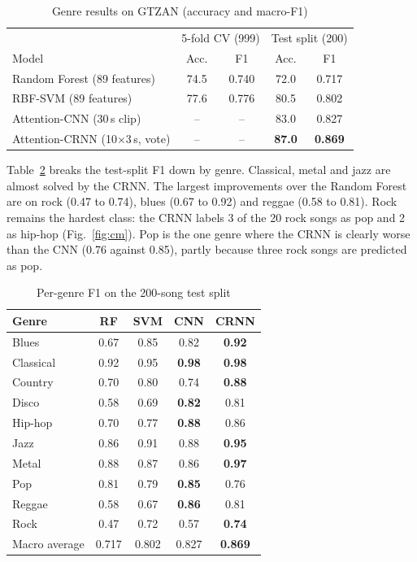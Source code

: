 \documentclass[conference]{IEEEtran}
\begin{document}
\begin{table}[t]
\caption{Genre results on GTZAN (accuracy and macro-F1)}
\label{tab:main}
\centering
\setlength{\tabcolsep}{4pt}
\begin{tabular}{@{}lcccc@{}}
\toprule
 & \multicolumn{2}{c}{5-fold CV (999)} & \multicolumn{2}{c}{Test split (200)}\\
Model & Acc. & F1 & Acc. & F1\\
\midrule
Random Forest (89 features) & 74.5 & 0.740 & 72.0 & 0.717\\
RBF-SVM (89 features) & 77.6 & 0.776 & 80.5 & 0.802\\
Attention-CNN (30\,s clip) & -- & -- & 83.0 & 0.827\\
Attention-CRNN (10$\times$3\,s, vote) & -- & -- & \textbf{87.0} & \textbf{0.869}\\
\bottomrule
\end{tabular}
\end{table}

Table~\ref{tab:pergenre} breaks the test-split F1 down by genre. Classical, metal and jazz are almost solved by the CRNN. The largest improvements over the Random Forest are on rock (0.47 to 0.74), blues (0.67 to 0.92) and reggae (0.58 to 0.81). Rock remains the hardest class: the CRNN labels 3 of the 20 rock songs as pop and 2 as hip-hop (Fig.~\ref{fig:cm}). Pop is the one genre where the CRNN is clearly worse than the CNN (0.76 against 0.85), partly because three rock songs are predicted as pop.

\begin{table}[t]
\caption{Per-genre F1 on the 200-song test split}
\label{tab:pergenre}
\centering
\begin{tabular}{@{}lcccc@{}}
\toprule
Genre & RF & SVM & CNN & CRNN\\
\midrule
Blues & 0.67 & 0.85 & 0.82 & \textbf{0.92}\\
Classical & 0.92 & 0.95 & \textbf{0.98} & \textbf{0.98}\\
Country & 0.70 & 0.80 & 0.74 & \textbf{0.88}\\
Disco & 0.58 & 0.69 & \textbf{0.82} & 0.81\\
Hip-hop & 0.70 & 0.77 & \textbf{0.88} & 0.86\\
Jazz & 0.86 & 0.91 & 0.88 & \textbf{0.95}\\
Metal & 0.88 & 0.87 & 0.86 & \textbf{0.97}\\
Pop & 0.81 & 0.79 & \textbf{0.85} & 0.76\\
Reggae & 0.58 & 0.67 & \textbf{0.86} & 0.81\\
Rock & 0.47 & 0.72 & 0.57 & \textbf{0.74}\\
\midrule
Macro average & 0.717 & 0.802 & 0.827 & \textbf{0.869}\\
\bottomrule
\end{tabular}
\end{table}
\end{document}
